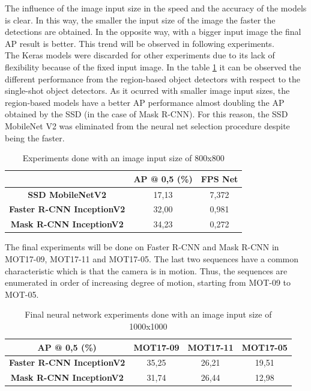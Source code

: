 The influence of the image input size in the speed and the accuracy of the models is clear. In this way, the smaller the input size of the image the faster the detections are obtained. In the opposite way, with a bigger input image the final AP result is better. This trend will be observed in following experiments.\\

The Keras models were discarded for other experiments due to its lack of flexibility because of the fixed input image. In the table \ref{tab:net_exp_3}  it can be observed the different performance from the region-based object detectors with respect to the single-shot object detectors. As it ocurred with smaller image input sizes, the region-based models have a better AP performance almost doubling the AP obtained by the SSD (in the case of Mask R-CNN). For this reason, the SSD MobileNet V2 was eliminated from the neural net selection procedure despite being the faster. 
\begin{table}[H]
\scriptsize
\begin{center}
\begin{tabular}{|c|c|c|}
\hline
\textbf{}                         & \textbf{AP @ 0,5 (\%)} & \textbf{FPS Net} \\ \hline
\textbf{SSD MobileNetV2}          & 17,13                  & 7,372             \\ \hline
\textbf{Faster R-CNN InceptionV2} & 32,00                  & 0,981            \\ \hline
\textbf{Mask R-CNN InceptionV2}   & 34,23                  & 0,272            \\ \hline
\end{tabular}
\end{center}
\caption{Experiments done with an image input size of 800x800}
\label{tab:net_exp_3}
\end{table}
The final experiments will be done on Faster R-CNN and Mask R-CNN in MOT17-09, MOT17-11 and MOT17-05. The last two sequences have a common characteristic which is that the camera is in motion. Thus, the sequences are enumerated in order of increasing degree of motion, starting from MOT-09 to MOT-05.
\begin{table}[H]
\scriptsize
\begin{center}
\begin{tabular}{|c|c|c|c|}
\hline
\textbf{AP @ 0,5 (\%)}            & \textbf{MOT17-09} & \textbf{MOT17-11} & \multicolumn{1}{l|}{\textbf{MOT17-05}} \\ \hline
\textbf{Faster R-CNN InceptionV2} & 35,25             & 26,21             & 19,51                                  \\ \hline
\textbf{Mask R-CNN InceptionV2}   & 31,74             & 26,44             & 12,98                                  \\ \hline
\end{tabular}
\end{center}
\caption{Final neural network experiments done with an image input size of 1000x1000}
\label{tab:net_exp_4}
\end{table}
